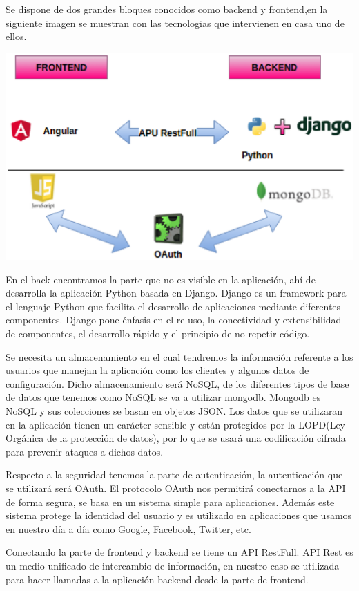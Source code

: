 \documentclass{article}
\begin{document}
Se dispone de dos grandes bloques conocidos como backend y frontend,en la siguiente imagen se muestran con las tecnologias que intervienen en casa uno de ellos.

\includegraphics[scale=0.8]{resources/frontback.eps}

En el back encontramos la parte que no es visible en la aplicación, ahí de desarrolla la aplicación Python basada en Django. Django es un framework para el lenguaje Python que facilita el desarrollo de aplicaciones mediante diferentes componentes. Django pone énfasis en el re-uso, la conectividad y extensibilidad de componentes, el desarrollo rápido y el principio de no repetir código.  

Se necesita un almacenamiento en el cual tendremos la información referente a los usuarios que manejan la aplicación como los clientes y algunos datos de configuración. Dicho almacenamiento será NoSQL, de los diferentes tipos de base de datos que tenemos como NoSQL se va a utilizar mongodb. Mongodb es NoSQL y sus colecciones se basan en objetos JSON. Los datos que se utilizaran en la aplicación tienen un carácter sensible y están protegidos por la LOPD(Ley Orgánica de la protección de datos), por lo que se usará una codificación cifrada para prevenir ataques a dichos datos.

Respecto a la seguridad tenemos la parte de autenticación, la autenticación que se utilizará será OAuth. El protocolo OAuth nos permitirá conectarnos a la API de forma segura, se basa en un sistema simple para aplicaciones. Además este sistema protege la identidad del usuario y es utilizado en aplicaciones que usamos en nuestro día a día como Google, Facebook, Twitter, etc.

Conectando la parte de frontend y backend se tiene un API RestFull. API Rest es un medio unificado de intercambio de información, en nuestro caso se utilizada para hacer llamadas a la aplicación backend desde la parte de frontend.
\end{document}
